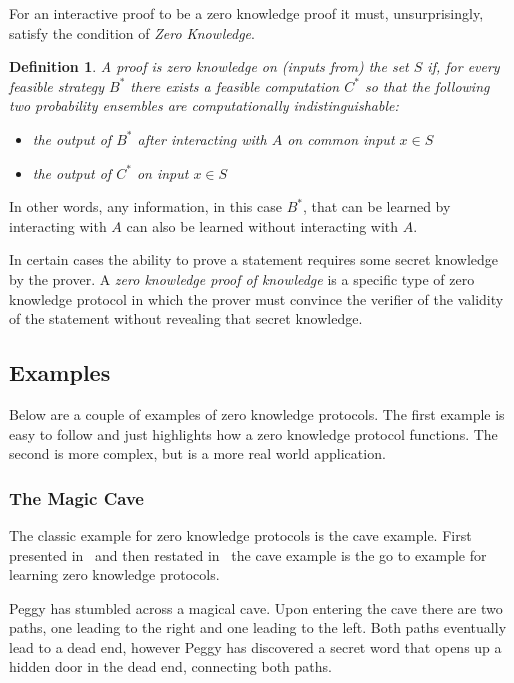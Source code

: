 \documentclass{sig-alternate}
\newtheorem{zeroKnowledge}{Definition}
\begin{document}
		For an interactive proof to be a zero knowledge proof it must, unsurprisingly,
		satisfy the condition of \textit{Zero Knowledge}.		
		
		\begin{zeroKnowledge}
			A proof is zero knowledge on (inputs from) the set $S$ if, for every feasible
			strategy $B^{*}$ there exists a feasible computation $C^{*}$ so that the
			following two probability ensembles are computationally indistinguishable:
			
			\begin{itemize}
				\item the output of $B^{*}$ after interacting with $A$ on common input
				$x \in S$
				
				\item the output of $C^{*}$ on input $x \in S$
			\end{itemize}						
			
		\end{zeroKnowledge}
		
		In other words, any information, in this case $B^{*}$, that can be learned by
		interacting with $A$ can also be learned without interacting with
		$A$.~\cite{Survey}
		
		In certain cases the ability to prove a statement requires some secret knowledge
		by the prover. A \textit{zero knowledge proof of knowledge} is a specific type
		of zero knowledge protocol in which the prover must convince the verifier
		of the validity of the statement without	revealing that secret knowledge.
		\cite{Wiki}

	\subsection{Examples}
	Below are a couple of examples of zero knowledge protocols. The first
	example is easy to follow and just highlights how a zero knowledge
	protocol functions. The second is more complex, but is a more
	real world application.

	\subsubsection{The Magic Cave}
	The classic example for zero knowledge protocols is the cave example.
	First presented in~\cite{Children:1987} and then restated
	in~\cite{Survey} the cave example is the go to example for learning
	zero knowledge protocols.

	Peggy has stumbled across a magical cave. Upon entering the cave
	there are two paths, one leading to the right and one leading to the
	left. Both paths eventually lead to a dead end, however Peggy has
	discovered a secret word that opens up a hidden door in the dead end,
	connecting both paths.
\end{document}
